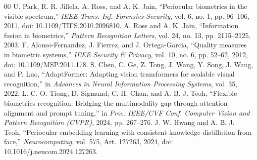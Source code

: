 ﻿\documentclass[10pt,journal,compsoc]{IEEEtran}
\begin{document}
\begin{thebibliography}{00}
 U. Park, R. R. Jillela, A. Ross, and A. K. Jain, ``Periocular biometrics in the visible spectrum,'' \textit{IEEE Trans. Inf. Forensics Security}, vol. 6, no. 1, pp. 96--106, 2011, doi: 10.1109/TIFS.2010.2096810.
 A. Ross and A. K. Jain, ``Information fusion in biometrics,'' \textit{Pattern Recognition Letters}, vol. 24, no. 13, pp. 2115--2125, 2003.
 F. Alonso-Fernandez, J. Fierrez, and J. Ortega-Garcia, ``Quality measures in biometric systems,'' \textit{IEEE Security \& Privacy}, vol. 10, no. 6, pp. 52--62, 2012, doi: 10.1109/MSP.2011.178.
 S. Chen, C. Ge, Z. Tong, J. Wang, Y. Song, J. Wang, and P. Luo, ``AdaptFormer: Adapting vision transformers for scalable visual recognition,'' in \textit{Advances in Neural Information Processing Systems}, vol. 35, 2022.
 L. C. O. Tiong, D. Sigmund, C.-H. Chan, and A. B. J. Teoh, ``Flexible biometrics recognition: Bridging the multimodality gap through attention alignment and prompt tuning,'' in \textit{Proc. IEEE/CVF Conf. Computer Vision and Pattern Recognition (CVPR)}, 2024, pp. 267--276.
 J. W. Hwang and A. B. J. Teoh, ``Periocular embedding learning with consistent knowledge distillation from face,'' \textit{Neurocomputing}, vol. 575, Art. 127263, 2024, doi: 10.1016/j.neucom.2024.127263.
\end{thebibliography}
\end{document}
